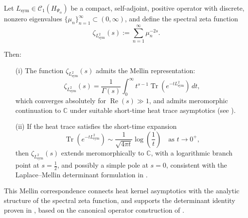 \begin{lemma}
\label{lem:spectral_zeta_from_heat}
Let \( L_{\mathrm{sym}} \in \mathcal{C}_1(H_{\Psi_\alpha}) \) be a compact, self-adjoint, positive operator with discrete, nonzero eigenvalues \( \{ \mu_n \}_{n=1}^\infty \subset (0, \infty) \), and define the spectral zeta function
\[
\zeta_{L_{\mathrm{sym}}^2}(s) := \sum_{n=1}^\infty \mu_n^{-2s}.
\]

Then:
\begin{enumerate}
    \item[\textnormal{(i)}] The function \( \zeta_{L_{\mathrm{sym}}^2}(s) \) admits the Mellin representation:
    \[
    \zeta_{L_{\mathrm{sym}}^2}(s)
    = \frac{1}{\Gamma(s)} \int_0^\infty t^{s-1} \operatorname{Tr}(e^{-t L_{\mathrm{sym}}^2}) \, dt,
    \]
    which converges absolutely for \( \operatorname{Re}(s) \gg 1 \), and admits meromorphic continuation to \( \mathbb{C} \) under suitable short-time heat trace asymptotics (see ).

    \item[\textnormal{(ii)}] If the heat trace satisfies the short-time expansion
    \[
    \operatorname{Tr}(e^{-t L_{\mathrm{sym}}^2}) \sim \frac{1}{\sqrt{4\pi t}} \log\left( \frac{1}{t} \right)
    \quad \text{as } t \to 0^+,
    \]
    then \( \zeta_{L_{\mathrm{sym}}^2}(s) \) extends meromorphically to \( \mathbb{C} \), with a logarithmic branch point at \( s = \tfrac{1}{2} \), and possibly a simple pole at \( s = 0 \), consistent with the Laplace–Mellin determinant formulation in .
\end{enumerate}

\medskip
\noindent
This Mellin correspondence connects heat kernel asymptotics with the analytic structure of the spectral zeta function, and supports the determinant identity proven in , based on the canonical operator construction of .
\end{lemma}
